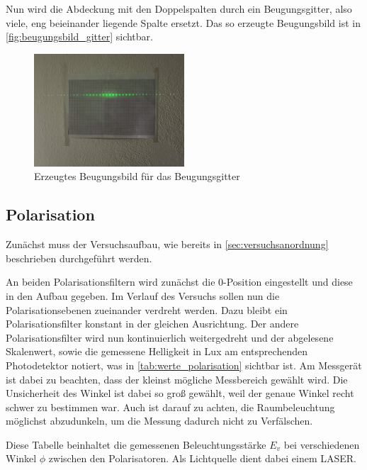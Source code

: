 \documentclass[12pt,english,ngerman]{scrartcl}
\begin{document}
Nun wird die Abdeckung mit den Doppelspalten durch ein Beugungsgitter, also
viele, eng beieinander liegende Spalte ersetzt. Das so erzeugte Beugungsbild
ist in \autoref{fig:beugungsbild_gitter} sichtbar.

\begin{figure}[H]
	\begin{center}
		\includegraphics[width =0.5\textwidth]{./figures/beugungsbild_gitter.jpg}
	\end{center}
	\caption[ Erzeugtes Beugungsbild für das Beugungsgitter] { Erzeugtes Beugungsbild für das
		Beugungsgitter
	}\label{fig:beugungsbild_gitter}
\end{figure}

\subsection{Polarisation}

Zunächst muss der Versuchsaufbau, wie bereits in
\autoref{sec:versuchsanordnung} beschrieben durchgeführt werden.

An beiden Polarisationsfiltern wird zunächst die 0-Position eingestellt und
diese in den Aufbau gegeben. Im Verlauf des Versuchs sollen nun die
Polarisationsebenen zueinander verdreht werden. Dazu bleibt ein
Polarisationsfilter konstant in der gleichen Ausrichtung. Der andere
Polarisationsfilter wird nun kontinuierlich weitergedreht und der abgelesene
Skalenwert, sowie die gemessene Helligkeit in Lux am entsprechenden
Photodetektor notiert, was in \autoref{tab:werte_polarisation} sichtbar ist. Am
Messgerät ist dabei zu beachten, dass der kleinst mögliche Messbereich gewählt
wird. Die Unsicherheit des Winkel ist dabei so groß gewählt, weil der genaue
Winkel recht schwer zu bestimmen war. Auch ist darauf zu achten, die
Raumbeleuchtung möglichst abzudunkeln, um die Messung dadurch nicht zu
Verfälschen.

\begin{table}[H]
	\caption{Diese Tabelle beinhaltet die gemessenen Beleuchtungsstärke $E_v$ 
  bei verschiedenen Winkel $\phi$ zwischen den Polarisatoren. Als Lichtquelle dient 
  dabei einem LASER.}\label{tab:werte_polarisation}
	\centering
	
\end{table}
\end{document}
